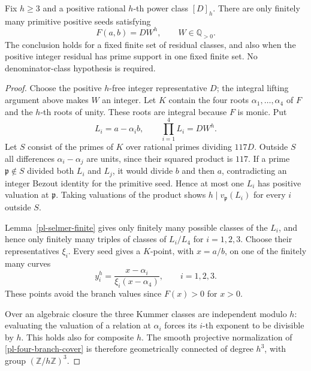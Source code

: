 \begin{theorem}
\label{pl-fixed-residual}
Fix $h\ge3$ and a positive rational $h$-th power class $[D]_h$.
There are only finitely many primitive positive seeds satisfying
\begin{equation}\label{pl-fixed-equation}
 F(a,b)=DW^h,\qquad W\in\mathbb Q_{>0}.
\end{equation}
The conclusion holds for a fixed finite set of residual classes,
and also when the positive integer residual has prime support in
one fixed finite set. No denominator-class hypothesis is required.
\end{theorem}
\begin{proof}
Choose the positive $h$-free integer representative $D$; the integral
lifting argument above makes $W$ an integer. Let $K$ contain the four
roots $\alpha_1,\ldots,\alpha_4$ of $F$ and the $h$-th roots of unity.
These roots are integral because $F$ is monic. Put
\[
 L_i=a-\alpha_i b,\qquad \prod_{i=1}^4L_i=DW^h.
\]
Let $S$ consist of the primes of $K$ over rational primes dividing
$117D$. Outside $S$ all differences $\alpha_i-\alpha_j$ are units,
since their squared product is $117$. If a prime $\mathfrak p\notin S$
divided both $L_i$ and $L_j$, it would divide $b$ and then $a$,
contradicting an integer Bezout identity for the primitive seed.
Hence at most one $L_i$ has positive valuation at $\mathfrak p$.
Taking valuations of the product shows
$h\mid v_{\mathfrak p}(L_i)$ for every $i$ outside $S$.

Lemma~\ref{pl-selmer-finite} gives only finitely many possible classes
of the $L_i$, and hence only finitely many triples of classes of
$L_i/L_4$ for $i=1,2,3$. Choose their representatives $\xi_i$.
Every seed gives a $K$-point, with $x=a/b$, on one of the finitely many
curves
\begin{equation}\label{pl-four-branch-cover}
 y_i^h=\frac{x-\alpha_i}{\xi_i(x-\alpha_4)},
 \qquad i=1,2,3.
\end{equation}
These points avoid the branch values since $F(x)>0$ for $x>0$.

Over an algebraic closure the three Kummer classes are independent
modulo $h$: evaluating the valuation of a relation at $\alpha_i$
forces its $i$-th exponent to be divisible by $h$. This holds also
for composite $h$. The smooth projective normalization of
\eqref{pl-four-branch-cover} is therefore geometrically connected of
degree $h^3$, with group $(\mathbb Z/h\mathbb Z)^3$.


\end{proof}
